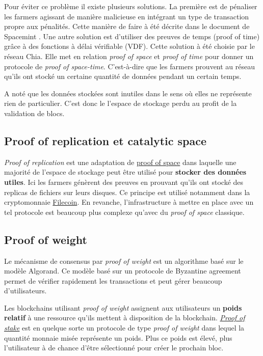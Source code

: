Pour éviter ce problème il existe plusieurs solutions. La première est de pénaliser les farmers agissant de manière malicieuse en intégrant un type de transaction propre aux pénalités. Cette manière de faire à été décrite dans le document de Spacemint \cite{DBLP:conf/fc/ParkKFGAP18}. Une autre solution est d'utiliser des preuves de temps (proof of time) grâce à des fonctions à délai vérifiable (VDF). Cette solution à été choisie par le réseau Chia. Elle met en relation \emph{proof of space} et \emph{proof of time} pour donner un protocole de \emph{proof of space-time}. C'est-à-dire que les farmers prouvent au réseau qu'ils ont stocké un certaine quantité de données pendant un certain temps.

A noté que les données stockées sont inutiles dans le sens où elles ne représente rien de particulier. C'est donc le l'espace de stockage perdu au profit de la validation de blocs.

\subsection{Proof of replication et catalytic space}

\emph{Proof of replication} est une adaptation de \hyperref[consensus:pospace]{proof of space} dans laquelle une majorité de l'espace de stockage peut être utilisé pour \textbf{stocker des données utiles}. Ici les farmers génèrent des preuves en prouvant qu'ils ont stocké des replicas de fichiers sur leurs disques. Ce principe est utilisé notamment dans la cryptomonnaie \href{https://filecoin.io/}{Filecoin}. En revanche, l'infrastructure à mettre en place avec un tel protocole est beaucoup plus complexe qu'avec du \emph{proof of space} classique.

\subsection{Proof of weight}

Le mécanisme de consensus par \emph{proof of weight} est un algorithme basé sur le modèle Algorand. Ce modèle basé sur un protocole de Byzantine agreement permet de vérifier rapidement les transactions et peut gérer beaucoup d'utilisateurs. 

Les blockchains utilisant \emph{proof of weight} assignent aux utilisateurs un \textbf{poids relatif} à une ressource qu'ils mettent à disposition de la blockchain. \hyperref[consensus:pos]{\emph{Proof of stake}} est en quelque sorte un protocole de type \emph{proof of weight} dans lequel la quantité monnaie misée représente un poids. Plus ce poids est élevé, plus l'utilisateur à de chance d'être sélectionné pour créer le prochain bloc.

